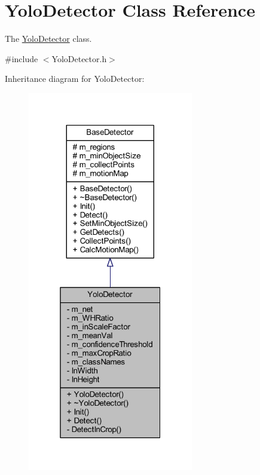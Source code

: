 \hypertarget{class_yolo_detector}{}\section{Yolo\+Detector Class Reference}
\label{class_yolo_detector}


The \mbox{\hyperlink{class_yolo_detector}{Yolo\+Detector}} class.  




{\ttfamily \#include $<$Yolo\+Detector.\+h$>$}



Inheritance diagram for Yolo\+Detector\+:\nopagebreak
\begin{figure}[H]
\begin{center}
\leavevmode
\includegraphics[width=205pt]{class_yolo_detector__inherit__graph}
\end{center}
\end{figure}


